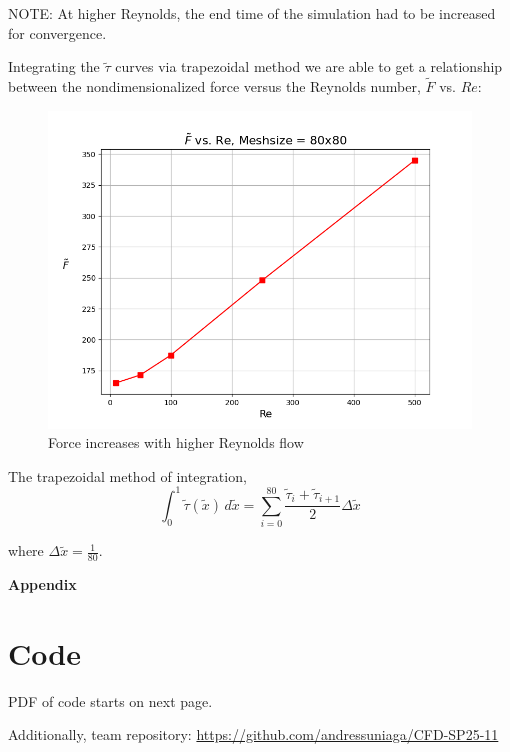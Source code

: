 \documentclass[11pt]{article}
\begin{document}
NOTE: At higher Reynolds, the end time of the simulation had to be increased for convergence.
\vspace{3.5mm}

Integrating the $\tilde{\tau}$ curves via trapezoidal method we are able to get a relationship between the nondimensionalized force versus the Reynolds number, $\tilde{F}$ vs. $Re$:

\begin{figure}[H]
   \centering
   \includegraphics[width = \textwidth]{images/Nondimensional_Force_vs._Re.png}
   \caption{Force increases with higher Reynolds flow}
   \label{force}
\end{figure}

The trapezoidal method of integration,
\begin{equation*}
   \displaystyle \int_{0}^{1} \tilde{\tau}(\tilde{x})\, d\tilde{x} = \sum_{i=0}^{80} \dfrac{\tilde{\tau}_{i}+\tilde{\tau}_{i+1}}{2} \Delta{\tilde{x}}
\end{equation*}

where $\Delta{\tilde{x}} = \frac{1}{80}$.


\pagebreak
\appendix
{} 
\begin{center}
\vspace*{\fill}
   \Huge \bf Appendix 
\vspace*{\fill}
\end{center}
\pagebreak 

\hypertarget{code}{}
\section{Code}
PDF of code starts on next page. 
\vspace{2.5mm}

Additionally, team repository: \url{https://github.com/andressuniaga/CFD-SP25-11}


\end{document}
